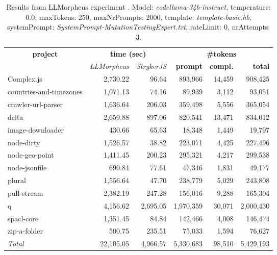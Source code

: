 
\begin{table*}[hbt!]
\centering
{\scriptsize
\begin{tabular}{l||r|r|r|r|r}
\multicolumn{1}{c|}{\bf project} & \multicolumn{2}{|c|}{\bf time (sec)} & \multicolumn{3}{|c|}{\bf \#tokens} \\
               & {\it LLMorpheus} & {\it StrykerJS} & {\bf prompt} & {\bf compl.} & {\bf total} \\
\hline
  Complex.js & 2,730.22 & 96.64 & 893,966 & 14,459 & 908,425 \\ 
countries-and-timezones & 1,071.13 & 74.16 & 89,939 & 3,112 & 93,051 \\ 
crawler-url-parser & 1,636.64 & 206.03 & 359,498 & 5,556 & 365,054 \\ 
delta & 2,659.88 & 897.06 & 820,541 & 13,471 & 834,012 \\ 
image-downloader & 430.66 & 65.63 & 18,348 & 1,449 & 19,797 \\ 
node-dirty & 1,526.57 & 38.82 & 223,071 & 4,425 & 227,496 \\ 
node-geo-point & 1,411.45 & 200.23 & 295,321 & 4,217 & 299,538 \\ 
node-jsonfile & 690.84 & 77.61 & 47,346 & 1,831 & 49,177 \\ 
plural & 1,556.64 & 47.70 & 238,779 & 5,029 & 243,808 \\ 
pull-stream & 2,382.19 & 247.28 & 156,016 & 9,288 & 165,304 \\ 
q & 4,156.62 & 2,695.05 & 1,970,359 & 30,071 & 2,000,430 \\ 
spacl-core & 1,351.45 & 84.84 & 142,466 & 4,008 & 146,474 \\ 
zip-a-folder & 500.75 & 235.51 & 75,033 & 1,594 & 76,627 \\ 
\hline
  \textit{Total} & 22,105.05 & 4,966.57 & 5,330,683 & 98,510 & 5,429,193 \\
  \end{tabular}
  }
  \\[2mm]
  \caption{Results from LLMorpheus experiment .
    Model: \textit{codellama-34b-instruct}, 
    temperature: 0.0, 
    maxTokens: 250, 
    maxNrPrompts: 2000, 
    template: \textit{template-basic.hb}, 
    systemPrompt: \textit{SystemPrompt-MutationTestingExpert.txt}, 
    rateLimit: 0, 
    nrAttempts: 3.  
  }
  \label{table:Cost:run393:codellama-34b-instruct:template-basic.hb:0.0}
\end{table*}